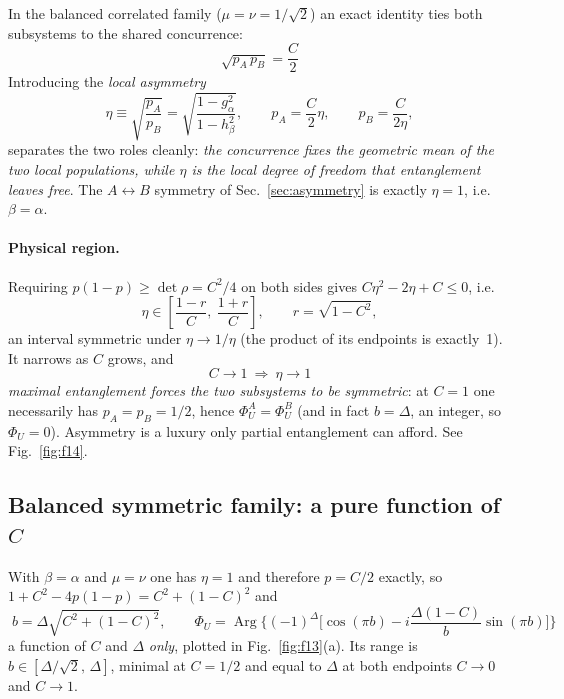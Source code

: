 \documentclass[11pt]{article}
\newcommand{\Arg}{\operatorname{Arg}}
\begin{document}
In the balanced correlated family ($\mu=\nu=1/\sqrt2$) an exact identity ties
both subsystems to the shared concurrence:
\begin{equation}
\boxed{\;\sqrt{p_A\,p_B}=\frac{C}{2}\;}
\label{eq:geometric-mean}
\end{equation}
Introducing the \emph{local asymmetry}
\begin{equation}
\eta\equiv\sqrt{\frac{p_A}{p_B}}=\sqrt{\frac{1-g_\alpha^2}{1-h_\beta^2}},
\qquad
p_A=\frac{C}{2}\eta,\qquad p_B=\frac{C}{2\eta} ,
\label{eq:eta}
\end{equation}
separates the two roles cleanly: \emph{the concurrence fixes the geometric mean
of the two local populations, while $\eta$ is the local degree of freedom that
entanglement leaves free}. The $A\leftrightarrow B$ symmetry of
Sec.~\ref{sec:asymmetry} is exactly $\eta=1$, i.e.\ $\beta=\alpha$.

\paragraph{Physical region.} Requiring $p(1-p)\ge\det\rho=C^2/4$ on both sides
gives $C\eta^2-2\eta+C\le0$, i.e.
\begin{equation}
\eta\in\left[\frac{1-r}{C},\ \frac{1+r}{C}\right],\qquad r=\sqrt{1-C^2},
\label{eq:eta-range}
\end{equation}
an interval symmetric under $\eta\to1/\eta$ (the product of its endpoints is
exactly~1). It narrows as $C$ grows, and
\begin{equation}
\boxed{\;C\to1\ \Longrightarrow\ \eta\to1\;}
\end{equation}
\emph{maximal entanglement forces the two subsystems to be symmetric}: at
$C=1$ one necessarily has $p_A=p_B=1/2$, hence $\Phi_U^A=\Phi_U^B$ (and in
fact $b=\Delta$, an integer, so $\Phi_U=0$). Asymmetry is a luxury only
partial entanglement can afford. See Fig.~\ref{fig:f14}.

\subsection{Balanced symmetric family: a pure function of $C$}

With $\beta=\alpha$ and $\mu=\nu$ one has $\eta=1$ and therefore $p=C/2$
exactly, so $1+C^2-4p(1-p)=C^2+(1-C)^2$ and
\begin{equation}
\boxed{\;b=\Delta\sqrt{C^2+(1-C)^2},\qquad
\Phi_U=\Arg\Big\{(-1)^\Delta\Big[\cos(\pi b)
-i\frac{\Delta(1-C)}{b}\sin(\pi b)\Big]\Big\}\;}
\label{eq:phiU-of-C}
\end{equation}
a function of $C$ and $\Delta$ \emph{only}, plotted in Fig.~\ref{fig:f13}(a).
Its range is $b\in[\Delta/\sqrt2,\,\Delta]$, minimal at $C=1/2$ and equal to
$\Delta$ at both endpoints $C\to0$ and $C\to1$.
\end{document}
